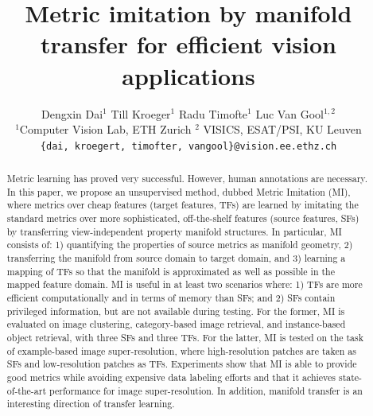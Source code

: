 \documentclass[10pt,twocolumn,letterpaper]{article}
\begin{document}
\title{Metric imitation by manifold transfer for
  efficient vision applications}

\author{
Dengxin Dai$^1$ \quad \quad Till Kroeger$^1$ \quad \quad Radu Timofte$^1$ \quad \quad Luc Van Gool$^{1,2}$\\
$^1$Computer Vision Lab, ETH Zurich  \quad  $^2$ VISICS, ESAT/PSI, KU Leuven\\
{\tt\small \{dai, kroegert, timofter, vangool\}@vision.ee.ethz.ch}
}

\maketitle

\begin{abstract}

  Metric learning has proved very successful. However, human annotations are necessary. 
  In this paper, we propose an
  unsupervised method, dubbed Metric Imitation (MI), where metrics
  over cheap features (target features, TFs) are learned by imitating the
  standard metrics over more sophisticated, off-the-shelf features (source features, SFs) by transferring
  view-independent property manifold structures. In particular, MI
  consists of: 1) quantifying the properties of source metrics as
  manifold geometry, 2) transferring the manifold from source domain
  to target domain, and 3) learning a mapping of TFs so that the
  manifold is approximated as well as possible in the mapped feature
  domain. MI is useful in at least two scenarios where: 1) TFs are
  more efficient computationally and in terms of memory than SFs; and
  2) SFs contain privileged information, but are not available
  during testing. For the former, MI is evaluated on image clustering,
  category-based image retrieval, and instance-based object retrieval,
  with three SFs and three TFs. For the latter, MI is tested on the
  task of example-based image super-resolution, where high-resolution
  patches are taken as SFs and low-resolution patches as
  TFs. Experiments show that MI is able to provide good metrics while
  avoiding expensive data labeling efforts and that it achieves
  state-of-the-art performance for image super-resolution. In
  addition, manifold transfer is an interesting direction of transfer
  learning.


  
\end{abstract}
\end{document}
